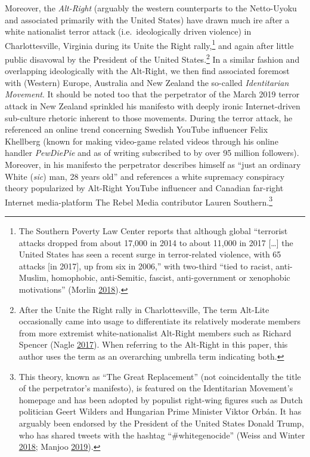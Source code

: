 \documentclass[10pt,british,A4paper,,openany]{memoir}
\begin{document}
Moreover, the \emph{Alt-Right} (arguably the western counterparts to the
Netto-Uyoku and associated primarily with the United States) have drawn
much ire after a white nationalist terror attack (i.e.~ideologically
driven violence) in Charlottesville, Virginia during its Unite the Right
rally,\footnote{The Southern Poverty Law Center reports that although
  global ``terrorist attacks dropped from about 17,000 in 2014 to about
  11,000 in 2017 {[}\ldots{}{]} the United States has seen a recent
  surge in terror-related violence, with 65 attacks {[}in 2017{]}, up
  from six in 2006,'' with two-third ``tied to racist, anti-Muslim,
  homophobic, anti-Semitic, fascist, anti-government or xenophobic
  motivations'' (Morlin
  \protect\hyperlink{ref-morlin_study_2018}{2018}).} and again after
little public disavowal by the President of the United States.\footnote{After
  the Unite the Right rally in Charlottesville, The term Alt-Lite
  occasionally came into usage to differentiate its relatively moderate
  members from more extremist white-nationalist Alt-Right members such
  as Richard Spencer (Nagle
  \protect\hyperlink{ref-nagle_kill_2017}{2017}). When referring to the
  Alt-Right in this paper, this author uses the term as an overarching
  umbrella term indicating both.} In a similar fashion and overlapping
ideologically with the Alt-Right, we then find associated foremost with
(Western) Europe, Australia and New Zealand the so-called
\emph{Identitarian Movement}. It should be noted too that the
perpetrator of the March 2019 terror attack in New Zealand sprinkled his
manifesto with deeply ironic Internet-driven sub-culture rhetoric
inherent to those movements. During the terror attack, he referenced an
online trend concerning Swedish YouTube influencer Felix Khellberg
(known for making video-game related videos through his online handler
\emph{PewDiePie} and as of writing subscribed to by over 95 million
followers). Moreover, in his manifesto the perpetrator describes himself
as ``just an ordinary White (\emph{sic}) man, 28 years old'' and
references a white supremacy conspiracy theory popularized by Alt-Right
YouTube influencer and Canadian far-right Internet media-platform The
Rebel Media contributor Lauren Southern.\footnote{This theory, known as
  ``The Great Replacement'' (not coincidentally the title of the
  perpetrator's manifesto), is featured on the Identitarian Movement's
  homepage and has been adopted by populist right-wing figures such as
  Dutch politician Geert Wilders and Hungarian Prime Minister Viktor
  Orbán. It has arguably been endorsed by the President of the United
  States Donald Trump, who has shared tweets with the hashtag
  ``\#whitegenocide'' (Weiss and Winter
  \protect\hyperlink{ref-weiss_opinion_2018}{2018}; Manjoo
  \protect\hyperlink{ref-manjoo_opinion_2019}{2019}).}
\end{document}
